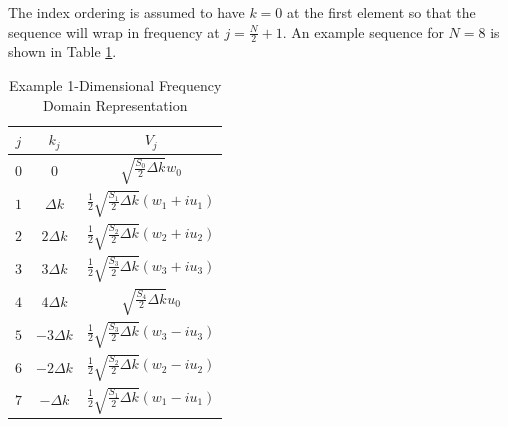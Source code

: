 The index ordering is assumed to have $k=0$ at the first element so that the sequence will wrap in frequency at $j = \frac{N}{2} + 1$. An example sequence for $N = 8$ is shown in Table \ref{os_tab:2a}.
\begin{table}[H]
  \begin{center}
      \renewcommand{\baselinestretch}{1} \small\normalsize
  \begin{quote}
    \caption[Example 1-Dimensional Frequency Domain Representation]{Example 1-Dimensional Frequency Domain Representation\label{os_tab:2a}}
  \end{quote}
  \begin{tabular} {| c | c | c |}
    \hline
  \bf{$j$} & \bf{$k_j$} & \bf{$V_j$} \\ \hline
  $0$ & $0$ & $\sqrt{\frac{S_{0}}{2} \Delta k}w_0$ \\ \hline
  $1$ & $\Delta k$ & $\frac{1}{2}\sqrt{\frac{S_{1}}{2} \Delta k} \left(w_1 + iu_1 \right)$ \\ \hline
  $2$ & $2\Delta k$ & $\frac{1}{2}\sqrt{\frac{S_{2}}{2} \Delta k} \left(w_2 + iu_2 \right)$ \\ \hline
  $3$ & $3\Delta k$ & $\frac{1}{2}\sqrt{\frac{S_{3}}{2} \Delta k} \left(w_3 + iu_3 \right)$ \\ \hline
  $4$ & $4\Delta k$ & $\sqrt{\frac{S_{4}}{2} \Delta k} u_0$ \\ \hline
  $5$ & $-3\Delta k$ & $\frac{1}{2}\sqrt{\frac{S_{3}}{2} \Delta k} \left(w_3 - iu_3 \right)$ \\ \hline
  $6$ & $-2\Delta k$ & $\frac{1}{2}\sqrt{\frac{S_{2}}{2} \Delta k} \left(w_2 - iu_2 \right)$  \\ \hline
  $7$ & $-\Delta k$ & $\frac{1}{2}\sqrt{\frac{S_{1}}{2} \Delta k} \left(w_1 - iu_1 \right)$ \\ \hline
\end{tabular}
\end{center}
\end{table}
\renewcommand{\baselinestretch}{2} \small\normalsize

